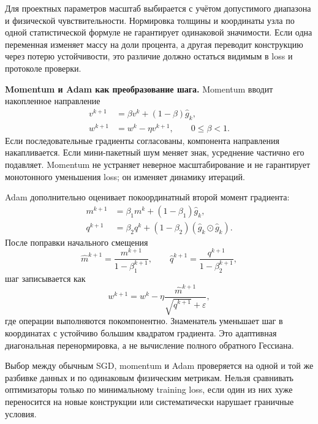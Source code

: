 Для проектных параметров масштаб выбирается с учётом допустимого диапазона и физической чувствительности. Нормировка толщины и координаты узла по одной статистической формуле не гарантирует одинаковой значимости. Если одна переменная изменяет массу на доли процента, а другая переводит конструкцию через потерю устойчивости, это различие должно остаться видимым в loss и протоколе проверки.

\medskip
\noindent\textbf{Momentum и Adam как преобразование шага.}
Momentum вводит накопленное направление
\begin{align}
 v^{k+1}
 &=
 \beta v^k+(1-\beta)\widehat g_k,
 \\
 w^{k+1}
 &=
 w^k-\eta v^{k+1},
 \qquad
 0\leq\beta<1.
\end{align}
Если последовательные градиенты согласованы, компонента направления накапливается. Если мини-пакетный шум меняет знак, усреднение частично его подавляет. Momentum не устраняет неверное масштабирование и не гарантирует монотонного уменьшения loss; он изменяет динамику итераций.

Adam дополнительно оценивает покоординатный второй момент градиента:
\begin{align}
 m^{k+1}
 &=
 \beta_1m^k+(1-\beta_1)\widehat g_k,
 \\
 q^{k+1}
 &=
 \beta_2q^k+(1-\beta_2)(\widehat g_k\odot\widehat g_k).
\end{align}
После поправки начального смещения
\begin{equation}
 \widehat m^{k+1}
 =
 \frac{m^{k+1}}{1-\beta_1^{k+1}},
 \qquad
 \widehat q^{k+1}
 =
 \frac{q^{k+1}}{1-\beta_2^{k+1}},
\end{equation}
шаг записывается как
\begin{equation}
 w^{k+1}
 =
 w^k
 -\eta
 \frac{\widehat m^{k+1}}
 {\sqrt{\widehat q^{k+1}}+\varepsilon},
\end{equation}
где операции выполняются покомпонентно. Знаменатель уменьшает шаг в координатах с устойчиво большим квадратом градиента. Это адаптивная диагональная перенормировка, а не вычисление полного обратного Гессиана.

Выбор между обычным SGD, momentum и Adam проверяется на одной и той же разбивке данных и по одинаковым физическим метрикам. Нельзя сравнивать оптимизаторы только по минимальному training loss, если один из них хуже переносится на новые конструкции или систематически нарушает граничные условия.


